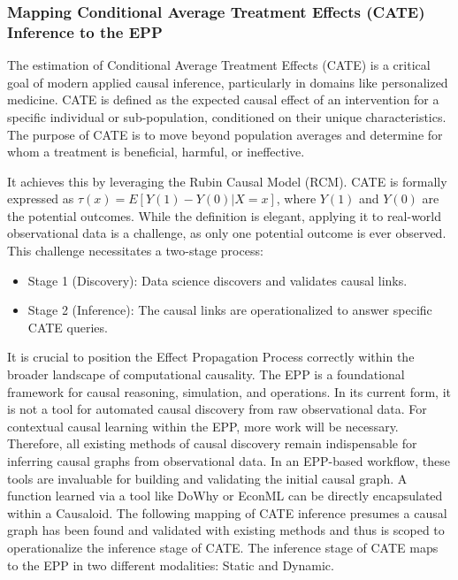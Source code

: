 %
%
\subsubsection{Mapping Conditional Average Treatment Effects (CATE) Inference to the EPP}
\label{sec:epp_cate}

The estimation of Conditional Average Treatment Effects (CATE) is a critical goal of modern applied causal inference, particularly in domains like personalized medicine. CATE is defined as the expected causal effect of an intervention for a specific individual or sub-population, conditioned on their unique characteristics. The purpose of CATE is to move beyond population averages and determine for whom a treatment is beneficial, harmful, or ineffective.

It achieves this by leveraging the Rubin Causal Model (RCM). CATE is formally expressed as $\tau(x) = E[Y(1) - Y(0) | X=x]$, where $Y(1)$ and $Y(0)$ are the potential outcomes. While the definition is elegant, applying it to real-world observational data is a challenge, as only one potential outcome is ever observed. This challenge necessitates a two-stage process:
\begin{itemize}
	\item Stage 1 (Discovery): Data science discovers and validates causal links.
	\item Stage 2 (Inference): The causal links are operationalized to answer specific CATE queries. 
\end{itemize} 

It is crucial to position the Effect Propagation Process correctly within the broader landscape of computational causality. The EPP is a foundational framework for causal reasoning, simulation, and operations. In its current form, it is not a tool for automated causal discovery from raw observational data. For contextual causal learning within the EPP, more work will be necessary. Therefore, all existing methods of causal discovery remain indispensable for inferring causal graphs from observational data. In an EPP-based workflow, these tools are invaluable for building and validating the initial causal graph. A function learned via a tool like DoWhy or EconML can be directly encapsulated within a Causaloid. The following mapping of CATE inference presumes a causal graph has been found and validated with existing methods and thus is scoped to operationalize the inference stage of CATE. The inference stage of CATE maps to the EPP in two different modalities: Static and Dynamic.


